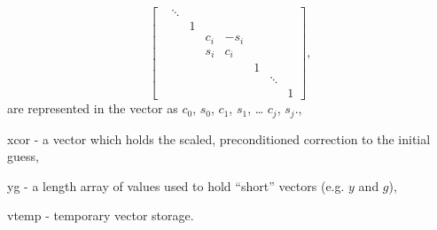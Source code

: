 \begin{args}
\begin{equation*}
\begin{bmatrix}
        & \ddots &   &     &      &   &        &   \\
        &        & 1 &     &      &   &        &   \\
        &        &   & c_i & -s_i &   &        &   \\
        &        &   & s_i &  c_i &   &        &   \\
        &        &   &     &      & 1 &        &   \\
        &        &   &     &      &   & \ddots &   \\
        &        &   &     &      &   &        & 1\end{bmatrix},
    \end{equation*}
    are represented in the  vector as 
    $c_0$,  $s_0$,  $c_1$,
     $s_1$, \ldots {} $c_j$,
     $s_j$.,
  \item[xcor] - a vector which holds the scaled, preconditioned
    correction to the initial guess,
  \item[yg] - a length  array of  values
    used to hold ``short'' vectors (e.g. $y$ and $g$),
  \item[vtemp] - temporary vector storage.
\end{args}
